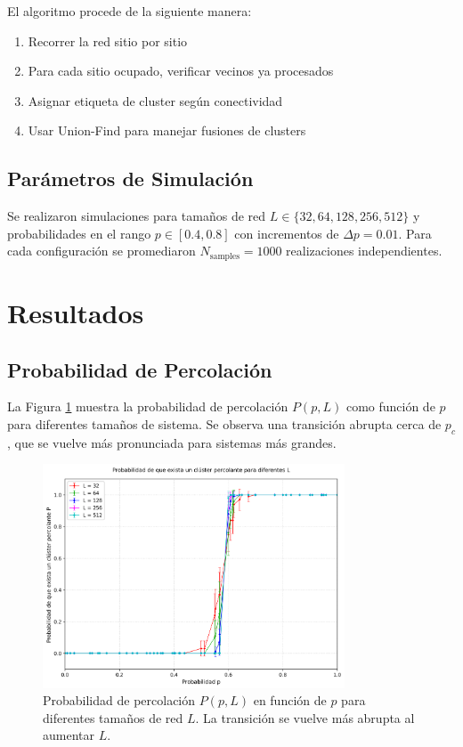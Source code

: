 \documentclass[11pt,a4paper]{article}
\begin{document}
El algoritmo procede de la siguiente manera:
\begin{enumerate}
    \item Recorrer la red sitio por sitio
    \item Para cada sitio ocupado, verificar vecinos ya procesados
    \item Asignar etiqueta de cluster según conectividad
    \item Usar Union-Find para manejar fusiones de clusters
\end{enumerate}

\subsection{Parámetros de Simulación}

Se realizaron simulaciones para tamaños de red $L \in \{32, 64, 128, 256, 512\}$ y probabilidades en el rango $p \in [0.4, 0.8]$ con incrementos de $\Delta p = 0.01$. Para cada configuración se promediaron $N_{\text{samples}} = 1000$ realizaciones independientes.

\section{Resultados}

\subsection{Probabilidad de Percolación}

La Figura \ref{fig:percolation_prob} muestra la probabilidad de percolación $P(p,L)$ como función de $p$ para diferentes tamaños de sistema. Se observa una transición abrupta cerca de $p_c$, que se vuelve más pronunciada para sistemas más grandes.

\begin{figure}[H]
    \centering
    \includegraphics[width=0.8\textwidth]{../figures/P_all_L.png}
    \caption{Probabilidad de percolación $P(p,L)$ en función de $p$ para diferentes tamaños de red $L$. La transición se vuelve más abrupta al aumentar $L$.}
    \label{fig:percolation_prob}
\end{figure}
\end{document}
